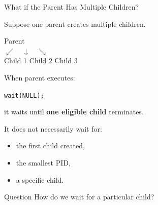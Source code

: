 \documentclass[aspectratio=169]{beamer}
\begin{document}
\begin{frame}{What if the Parent Has Multiple Children?}

Suppose one parent creates multiple children.

\begin{center}
Parent\\
$\swarrow \quad \downarrow \quad \searrow$\\
Child 1 \qquad Child 2 \qquad Child 3
\end{center}

When parent executes:

\begin{center}
\texttt{wait(NULL);}
\end{center}

it waits until \textbf{one eligible child} terminates.

It does not necessarily wait for:

\begin{itemize}

    \item the first child created,

    \item the smallest PID,

    \item a specific child.

\end{itemize}

\begin{alertblock}{Question}
How do we wait for a particular child?
\end{alertblock}

\end{frame}
\end{document}
